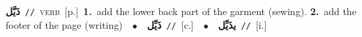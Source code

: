 \documentclass[10pt,a4paper,twoside]{article} %
\begin{document}
\begin{multicols}{2}
{\setlength\topsep{0pt}\textbf{\foreignlanguage{arabic}{ذَيَّل}}\ {\color{gray}\texttt{//}\color{black}}\ \textsc{verb}\ [p.]\ \textbf{1.}~add the lower back part of the garment (sewing).  \textbf{2.}~add the footer of the page (writing)\ \ $\bullet$\ \ \setlength\topsep{0pt}\textbf{\foreignlanguage{arabic}{ذَيِّل}}\ {\color{gray}\texttt{//}\color{black}}\ [c.]\ \ $\bullet$\ \ \setlength\topsep{0pt}\textbf{\foreignlanguage{arabic}{يذَيِّل}}\ {\color{gray}\texttt{//}\color{black}}\ [i.]\ } \vspace{2mm}

\end{multicols}
\end{document}
